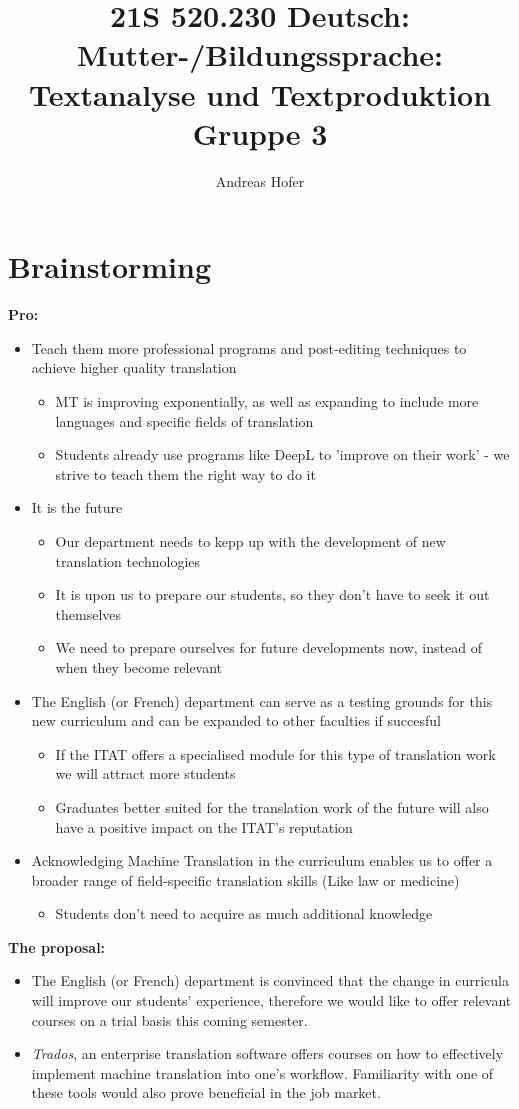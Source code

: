 \documentclass{article}
\title{\vspace{-3cm}21S 520.230 Deutsch: Mutter-/Bildungssprache: Textanalyse und Textproduktion Gruppe 3}
\author{Andreas Hofer}
\begin{document}
	\section*{Brainstorming}
	\textbf{Pro:}
	\begin{itemize}
		\item{Teach them more professional programs and post-editing techniques to achieve higher quality translation}
		\begin{itemize}
			\item{MT is improving exponentially, as well as expanding to include more languages and specific fields of translation}
			\item{Students already use programs like DeepL to 'improve on their work' - we strive to teach them the right way to do it}
		\end{itemize}
		\item{It is the future}
		\begin{itemize}
			\item{Our department needs to kepp up with the development of new translation technologies}
			\item{It is upon us to prepare our students, so they don't have to seek it out themselves}
			\item{We need to prepare ourselves for future developments now, instead of when they become relevant}
		\end{itemize}
		\item{The English (or French) department can serve as a testing grounds for this new curriculum and can be expanded to other faculties if succesful}
		\begin{itemize}
			\item{If the ITAT offers a specialised module for this type of translation work we will attract more students}
			\item{Graduates better suited for the translation work of the future will also have a positive impact on the ITAT's reputation}
		\end{itemize}
		\item{Acknowledging Machine Translation in the curriculum enables us to offer a broader range of field-specific translation skills (Like law or medicine)}
		\begin{itemize}
			\item{Students don't need to acquire as much additional knowledge}
		\end{itemize}
	\end{itemize}
	\textbf{The proposal:}
	\begin{itemize}
		\item{The English (or French) department is convinced that the change in curricula will improve our students' experience, therefore we would like to offer relevant courses on a trial basis this coming semester.}
		\item{\textit{Trados}, an enterprise translation software offers courses on how to effectively implement machine translation into one's workflow. Familiarity with one of these tools would also prove beneficial in the job market.}
	\end{itemize}
\end{document}
